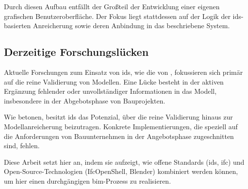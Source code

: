 Durch diesen Aufbau entfällt der Großteil der Entwicklung einer eigenen grafischen Benutzeroberfläche. 
Der Fokus liegt stattdessen auf der Logik der \gls{ids}-basierten Anreicherung 
sowie deren Anbindung in das beschriebene System.

\subsection{Derzeitige Forschungslücken}

Aktuelle Forschungen zum Einsatz von \gls{ids}, wie die von \cite{kladz2025ids}, 
fokussieren sich primär auf die reine Validierung von Modellen. 
Eine Lücke besteht in der aktiven Ergänzung fehlender oder 
unvollständiger Informationen in das Modell, insbesondere in der Abgebotsphase von Bauprojekten.
 
Wie \cite{de2024enriching} betonen, besitzt \gls{ids} das Potenzial, über die reine Validierung hinaus 
zur Modellanreicherung beizutragen. Konkrete Implementierungen, die speziell auf die Anforderungen von 
Bauunternehmen in der Angebotsphase zugeschnitten sind, fehlen.

Diese Arbeit setzt hier an, indem sie aufzeigt, wie offene Standards (\gls{ids}, \gls{ifc}) 
und Open-Source-Technologien (IfcOpenShell, Blender) kombiniert werden können, um hier einen 
durchgängigen \gls{bim}-Prozess zu realisieren.
